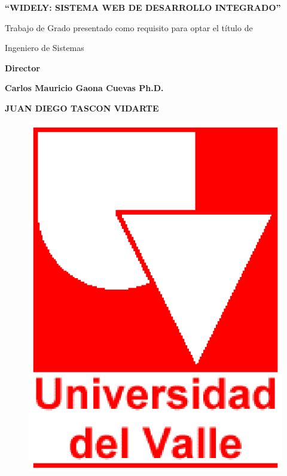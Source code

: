 \newpage


\begin{center} \textbf{\newline\newline} \end{center}
\begin{center} \textbf{``WIDELY: SISTEMA WEB DE DESARROLLO INTEGRADO''} \end{center}

\vspace{5em}

\begin{center} Trabajo de Grado presentado como requisito para optar el título de\end{center}
\begin{center} Ingeniero de Sistemas \end{center}

\vspace{1em}

\begin{center} \textbf{ Director } \end{center}
\begin{center} \textbf{ Carlos Mauricio Gaona Cuevas Ph.D. } \end{center}

\vspace{5em}

\begin{center} \textbf{JUAN DIEGO TASCON VIDARTE} \end{center}

\vspace{3em}


\begin{figure}[h]
	\centering
	\includegraphics[scale=0.3]{./img/uvlogo}
	\label{img:uvlogo-p2}
\end{figure}

